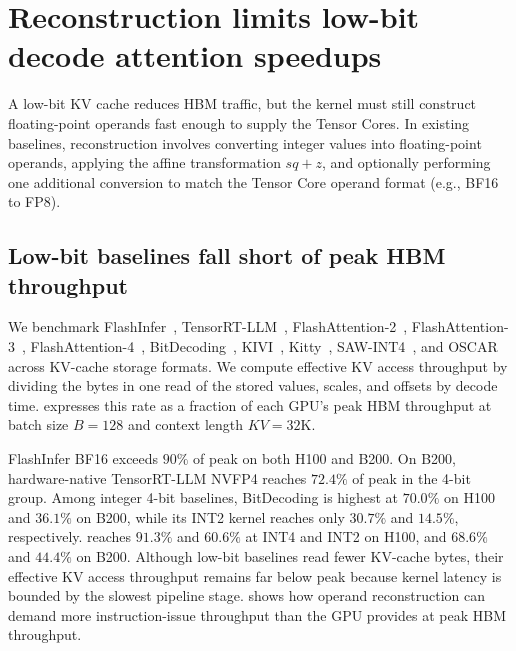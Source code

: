 \section{Reconstruction limits low-bit decode attention speedups}
\label{sec:analysis}

A low-bit KV cache reduces HBM traffic, but the kernel must still construct floating-point operands fast enough to supply the Tensor Cores.
In existing baselines, reconstruction involves converting integer values into floating-point operands, applying the affine transformation $sq+z$, and optionally performing one additional conversion to match the Tensor Core operand format (e.g., BF16 to FP8).

\subsection{Low-bit baselines fall short of peak HBM throughput}
\label{sec:analysis-gap}



We benchmark FlashInfer~\cite{ye2025flashinfer}, TensorRT-LLM~\cite{nvidia2026trtllm}, FlashAttention-2~\cite{dao2024flashattention2}, FlashAttention-3~\cite{shah2024flashattention3}, FlashAttention-4~\cite{zadouri2026flashattention4}, BitDecoding~\cite{du2026bitdecoding}, KIVI~\cite{liu2024kivi}, Kitty~\cite{xia2025kitty}, SAW-INT4~\cite{jia2026saw}, and OSCAR~\cite{zhou2026oscar} across KV-cache storage formats.
We compute effective KV access throughput by dividing the bytes in one read of the stored values, scales, and offsets by decode time.
 expresses this rate as a fraction of each GPU's peak HBM throughput at batch size $B=128$ and context length $KV=32\mathrm{K}$.

FlashInfer BF16 exceeds $90\%$ of peak on both H100 and B200.
On B200, hardware-native TensorRT-LLM NVFP4 reaches $72.4\%$ of peak in the 4-bit group.
Among integer 4-bit baselines, BitDecoding is highest at $70.0\%$ on H100 and $36.1\%$ on B200, while its INT2 kernel reaches only $30.7\%$ and $14.5\%$, respectively.
\sys{} reaches $91.3\%$ and $60.6\%$ at INT4 and INT2 on H100, and $68.6\%$ and $44.4\%$ on B200.
Although low-bit baselines read fewer KV-cache bytes, their effective KV access throughput remains far below peak because kernel latency is bounded by the slowest pipeline stage.
 shows how operand reconstruction can demand more instruction-issue throughput than the GPU provides at peak HBM throughput.

